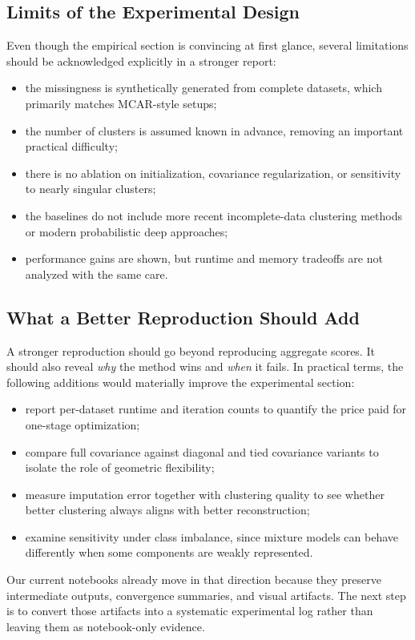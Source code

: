\subsection{Limits of the Experimental Design}
Even though the empirical section is convincing at first glance, several limitations should be acknowledged explicitly in a stronger report:
\begin{itemize}
    \item the missingness is synthetically generated from complete datasets, which primarily matches MCAR-style setups;
    \item the number of clusters is assumed known in advance, removing an important practical difficulty;
    \item there is no ablation on initialization, covariance regularization, or sensitivity to nearly singular clusters;
    \item the baselines do not include more recent incomplete-data clustering methods or modern probabilistic deep approaches;
    \item performance gains are shown, but runtime and memory tradeoffs are not analyzed with the same care.
\end{itemize}

\subsection{What a Better Reproduction Should Add}
A stronger reproduction should go beyond reproducing aggregate scores. It should also reveal \emph{why} the method wins and \emph{when} it fails. In practical terms, the following additions would materially improve the experimental section:
\begin{itemize}
    \item report per-dataset runtime and iteration counts to quantify the price paid for one-stage optimization;
    \item compare full covariance against diagonal and tied covariance variants to isolate the role of geometric flexibility;
    \item measure imputation error together with clustering quality to see whether better clustering always aligns with better reconstruction;
    \item examine sensitivity under class imbalance, since mixture models can behave differently when some components are weakly represented.
\end{itemize}

Our current notebooks already move in that direction because they preserve intermediate outputs, convergence summaries, and visual artifacts. The next step is to convert those artifacts into a systematic experimental log rather than leaving them as notebook-only evidence.

